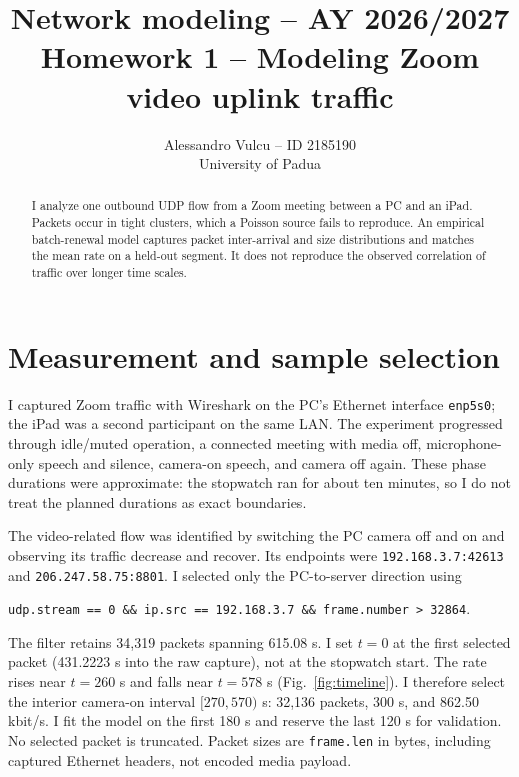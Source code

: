 \documentclass[10pt]{article}
\begin{document}
\title{Network modeling -- AY 2026/2027\\
Homework 1 -- Modeling Zoom video uplink traffic}
\author{Alessandro Vulcu -- ID 2185190\\University of Padua}
\date{}
\maketitle
\vspace{-1.4em}
\begin{abstract}
I analyze one outbound UDP flow from a Zoom meeting between a PC and an iPad.
Packets occur in tight clusters, which a Poisson source fails to reproduce.
An empirical batch-renewal model captures packet inter-arrival and size distributions and
matches the mean rate on a held-out segment. It does not reproduce the observed
correlation of traffic over longer time scales.
\end{abstract}
\vspace{-0.6em}

\section{Measurement and sample selection}
I captured Zoom traffic with Wireshark on the PC's Ethernet interface
\texttt{enp5s0}; the iPad was a second participant on the same LAN.
The experiment progressed through idle/muted operation, a connected meeting with
media off, microphone-only speech and silence, camera-on speech, and camera off
again. These phase durations were approximate: the stopwatch ran for about ten
minutes, so I do not treat the planned durations as exact boundaries.

The video-related flow was identified by switching the PC camera off and on and
observing its traffic decrease and recover. Its endpoints were
\texttt{192.168.3.7:42613} and \texttt{206.247.58.75:8801}.
I selected only the PC-to-server direction using
\begin{center}
\small\texttt{udp.stream == 0 \&\& ip.src == 192.168.3.7 \&\& frame.number > 32864}.
\end{center}
\vspace{-0.5em}
The filter retains 34,319 packets spanning 615.08 s. I set $t=0$ at the first
selected packet (431.2223 s into the raw capture), not at the stopwatch start.
The rate rises near $t=260$ s and falls near $t=578$ s (Fig.~\ref{fig:timeline}).
I therefore select the interior camera-on interval $[270,570)$ s: 32,136 packets,
300 s, and 862.50 kbit/s. I fit the model on the first 180 s and reserve the last
120 s for validation.
No selected packet is truncated. Packet sizes are \texttt{frame.len} in bytes,
including captured Ethernet headers, not encoded media payload.
\end{document}
